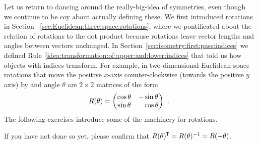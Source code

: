 \documentclass[12pt, oneside]{report}    %
\begin{document}
Let us return to dancing around the really-big-idea of symmetries, even though we continue to be coy about actually defining these. We first introduced rotations in Section~
\ref{sec:Euclidean:three:space:rotations}, where we pontificated about the relation of rotations to the dot product because rotations leave vector lengths and angles between vectors unchanged. In Section~\ref{sec:isometry:first:pass:indices} we defined Rule~\ref{idea:transformation:of:upper:and:lower:indices} that told us how objects with indices transform. For example, in two-dimensional Euclidean space rotations that move the positive $x$-axis counter-clockwise (towards the positive $y$ axis) by and angle $\theta$ are $2\times 2$ matrices of the form
\begin{align}
    R(\theta)=
    \begin{pmatrix}
        \cos\theta & -\sin\theta \\
        \sin\theta & \pp \cos\theta
    \end{pmatrix} \ .
\end{align}
The following exercises introduce some of the machinery for rotations.
\begin{exercise}
If you have not done so yet, please confirm that $R(\theta)^{\mkern-1.5mu\mathsf{T}} = R(\theta)^{-1} = R(-\theta)$.
\end{exercise}
\end{document}
